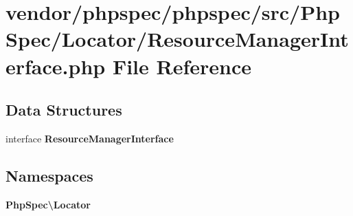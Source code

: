 \section{vendor/phpspec/phpspec/src/\+Php\+Spec/\+Locator/\+Resource\+Manager\+Interface.php File Reference}
\label{_resource_manager_interface_8php}
\subsection*{Data Structures}
\begin{DoxyCompactItemize}
\item 
interface {\bf Resource\+Manager\+Interface}
\end{DoxyCompactItemize}
\subsection*{Namespaces}
\begin{DoxyCompactItemize}
\item 
 {\bf Php\+Spec\textbackslash{}\+Locator}
\end{DoxyCompactItemize}
